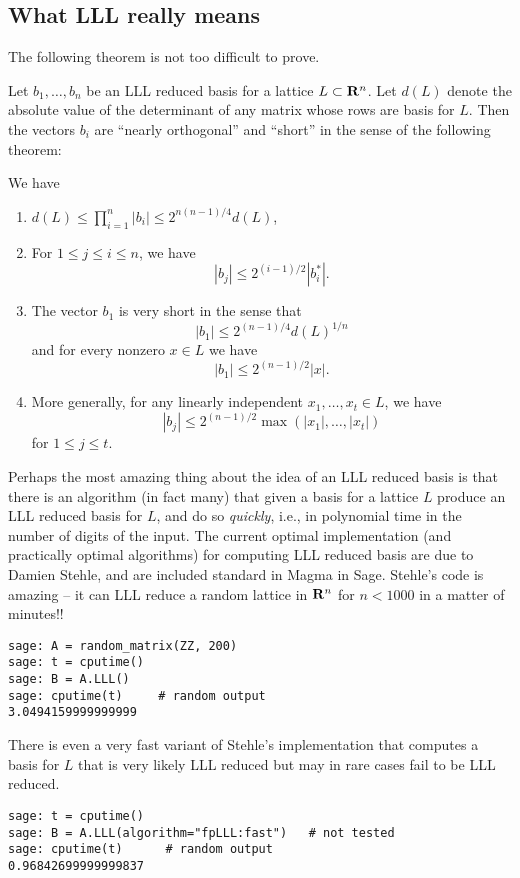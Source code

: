 \subsection{What LLL really means}
The following theorem is not too difficult to prove.

Let $b_1, \ldots, b_n$ be an LLL reduced basis
for a lattice $L\subset \mathbf{R}^n$.  Let $d(L)$ denote
the absolute value of the determinant of any matrix
whose rows are basis for $L$.   Then the vectors
$b_i$ are ``nearly orthogonal'' and ``short'' in 
the sense of the following theorem:
\begin{theorem}
We have
\begin{enumerate}
\item $d(L) \leq \prod_{i=1}^n |b_i| \leq 2^{n(n-1)/4} d(L)$,
\item For $1\leq j \leq i \leq n$, we have
$$
 |b_j| \leq 2^{(i-1)/2} |b_i^*|.
$$
\item The vector $b_1$ is very short in the sense that
$$
  |b_1| \leq 2^{(n-1)/4} d(L)^{1/n}
$$
and for every nonzero $x \in L$ we have
$$
  |b_1| \leq 2^{(n-1)/2} |x|.
$$
\item More generally, for any linearly independent $x_1,\ldots, x_t \in L$, we have 
$$
  |b_j| \leq 2^{(n-1)/2} \max(|x_1|, \ldots, |x_t|)
$$
for $1\leq j \leq t$. 
\end{enumerate}
\end{theorem}

Perhaps the most amazing thing about the idea of an LLL
reduced basis is that there is an algorithm (in fact many)
that given a basis for a lattice $L$ produce an LLL reduced
basis for $L$, and do so {\em quickly}, i.e., in polynomial
time in the number of digits of the input.   The current
optimal implementation (and practically optimal algorithms)
for computing LLL reduced basis are due to Damien Stehle,
and are included standard in Magma in Sage.   Stehle's code
is amazing -- it can LLL reduce a random lattice in $\mathbf{R}^{n}$
for $n<1000$ in a matter of minutes!!
\begin{verbatim}
sage: A = random_matrix(ZZ, 200)
sage: t = cputime()
sage: B = A.LLL()     
sage: cputime(t)     # random output
3.0494159999999999
\end{verbatim}%

\noindent{}There is even a very fast variant of Stehle's implementation that computes a basis for $L$ that is very likely LLL reduced but may in rare
cases fail to be LLL reduced.

\begin{verbatim}
sage: t = cputime()
sage: B = A.LLL(algorithm="fpLLL:fast")   # not tested
sage: cputime(t)      # random output
0.96842699999999837
\end{verbatim}

